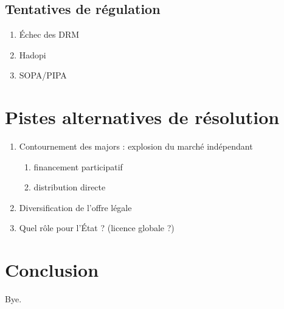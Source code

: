 \documentclass[a4paper]{report}
\begin{document}
	\section{Tentatives de régulation}
	\begin{enumerate}
		\item Échec des DRM
		\item Hadopi
		\item SOPA/PIPA
	\end{enumerate}





	\chapter{Pistes alternatives de résolution}

	\begin{enumerate}
		\item Contournement des majors : explosion du marché indépendant
		\begin{enumerate}
		 	\item financement participatif
		 	\item distribution directe
		 \end{enumerate}
		 \item Diversification de l'offre légale
		 \item Quel rôle pour l'État ? (licence globale ?)
	\end{enumerate}





	\chapter{Conclusion}

	Bye.




\end{document}
